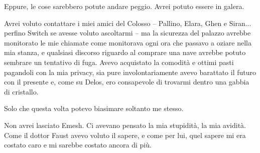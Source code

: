 Eppure, le cose sarebbero potute andare peggio. Avrei potuto essere in
galera.

Avrei voluto contattare i miei amici del Colosso -- Pallino, Elara, Ghen
e Siran... perfino Switch se avesse voluto ascoltarmi -- ma la sicurezza
del palazzo avrebbe monitorato le mie chiamate come monitorava ogni ora
che passavo a oziare nella mia stanza, e qualsiasi discorso riguardo al
comprare una nave avrebbe potuto sembrare un tentativo di fuga. Avevo
acquistato la comodità e ottimi pasti pagandoli con la mia privacy, sia
pure involontariamente avevo barattato il futuro con il presente e, come
su Delos, ero consapevole di trovarmi dentro una gabbia di cristallo.

Solo che questa volta potevo biasimare soltanto me stesso.

Non avrei lasciato Emesh. Ci avevano pensato la mia stupidità, la mia
avidità. Come il dottor Faust avevo voluto il sapere, e come per lui,
quel sapere mi era costato caro e mi sarebbe costato ancora di più.

